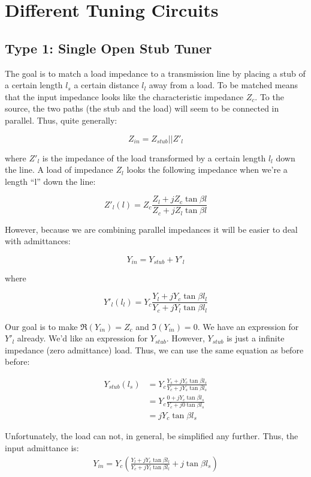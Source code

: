 \section{Different Tuning Circuits}
\addtocounter{section}{1}
\setcounter{equation}{0}
\subsection{Type 1: Single Open Stub Tuner}

The goal is to match a load impedance to a transmission line by placing a stub
of a certain length $l_s$ a certain distance $l_l$ away from a load. To be
matched means that the input impedance looks like the characteristic impedance
$Z_c$. To the source, the two paths (the stub and the load) will seem to be
connected in parallel. Thus, quite generally:

\[ 
        Z_{in} = Z_{stub} || Z'_l
\]

where $Z'_l$ is the impedance of the load transformed by a certain length
$l_{l}$ down the line. A load of impedance $Z_l$ looks the following
impedance when we're a length ``l'' down the line:

\[ 
        Z'_l(l) = Z_c \frac{Z_l + j Z_c \tan \beta l}{Z_c + j Z_l \tan \beta l} 
\]

However, because we are combining parallel impedances it will be easier to deal
with admittances:

\[ 
        Y_{in} = Y_{stub} + Y'_l 
\]

where

\[ 
        Y'_l(l_l) = Y_c \frac{Y_l + j Y_c\tan\beta l_l}{Y_c + j Y_l \tan \beta
        l_l}
\]

Our goal is to make $\Re \left( Y_{in} \right) = Z_c$ and $ \Im \left( Y_{in}
\right) = 0$. We have an expression for $Y'_l$ already. We'd like an expression
for $Y_{stub}$. However, $Y_{stub}$ is just a infinite impedance (zero
admittance) load. Thus, we can use the same equation as before before:

\begin{align*}
    Y_{stub}(l_s) &= Y_c \frac{Y_s + j Y_c\tan\beta l_s}{Y_c + j Y_s \tan \beta
       l_s}  \\
       &= Y_c \frac{0 + jY_c\tan\beta l_s}{Y_c + j0\tan\beta l_s} \\
       &= j Y_c \tan \beta l_s
\end{align*}

Unfortunately, the load can not, in general, be simplified any further. Thus,
the input admittance is:
\begin{align*}
    Y_{in} = Y_c \left( \frac{Y_l + j Y_c\tan\beta l_l}{Y_c + j Y_l \tan \beta
    l_l} + j \tan \beta l_s \right)
\end{align*}

